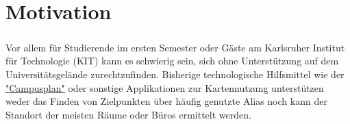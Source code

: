 \chapter{Motivation}

\paragraph{}
Vor allem für Studierende im ersten Semester oder Gäste am Karlsruher Institut für Technologie (KIT) 
kann es schwierig sein, sich ohne Unterstützung auf dem Universitätsgelände zurechtzufinden. Bisherige 
technologische Hilfsmittel wie der \href{https://www.kit.edu/campusplan/}{"Campusplan"} oder sonstige Applikationen
zur Kartennutzung unterstützen weder das Finden von Zielpunkten über häufig genutzte Alias noch
kann der Standort der meisten Räume oder Büros ermittelt werden.
